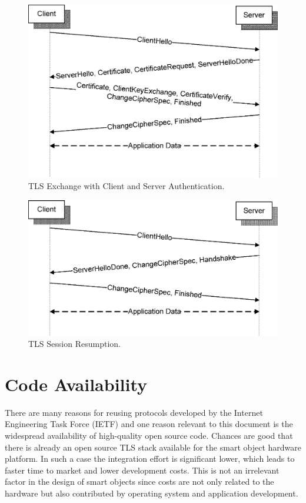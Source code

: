 \documentclass[a4paper, 10pt]{IEEEtran}
\begin{document}
\begin{figure}[!t]
 \centering
 \includegraphics[scale=0.50]{TLS-Client-Authentication}
 \caption{TLS Exchange with Client and Server Authentication.}
 \label{tls-client-authentication-figure}
\end{figure}

\begin{figure}[!t]
 \centering
 \includegraphics[scale=0.50]{TLS-Session-Resumption}
 \caption{TLS Session Resumption.}
 \label{tls-session-resumption-figure}
\end{figure}

\section{Code Availability}

There are many reasons for reusing protocols developed by the Internet Engineering Task Force (IETF) and one reason relevant to this document is the widespread availability of high-quality open source code. Chances are good that there is already an open source TLS stack available for the smart object hardware platform. In such a case the integration effort is significant lower, which leads to faster time to market and lower development costs. This is not an irrelevant factor in the design of smart objects since costs are not only related to the hardware but also contributed by operating system and application development. 
\end{document}
